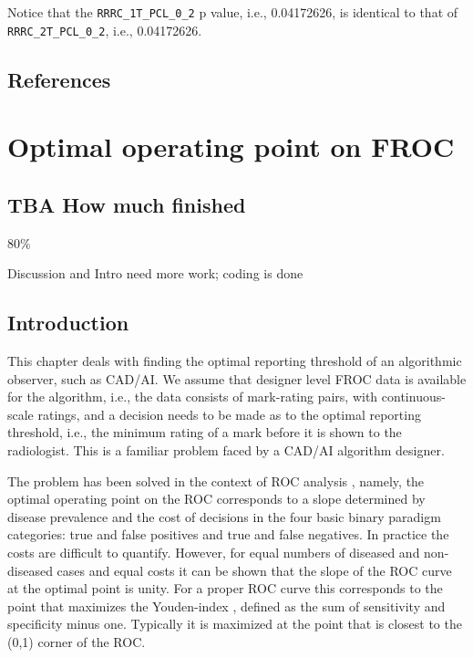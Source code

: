 \documentclass[
]{book}
\begin{document}
Notice that the \texttt{RRRC\_1T\_PCL\_0\_2} p value, i.e., 0.04172626, is identical to that of \texttt{RRRC\_2T\_PCL\_0\_2}, i.e., 0.04172626.

\hypertarget{standalone-cad-radiologists-references}{%
\section{References}\label{standalone-cad-radiologists-references}}

\hypertarget{optim-op-point}{%
\chapter{Optimal operating point on FROC}\label{optim-op-point}}

\hypertarget{optim-op-point-how-much-finished}{%
\section{TBA How much finished}\label{optim-op-point-how-much-finished}}

80\%

Discussion and Intro need more work; coding is done

\hypertarget{optim-op-point-intro}{%
\section{Introduction}\label{optim-op-point-intro}}

This chapter deals with finding the optimal reporting threshold of an algorithmic observer, such as CAD/AI. We assume that designer level FROC data is available for the algorithm, i.e., the data consists of mark-rating pairs, with continuous-scale ratings, and a decision needs to be made as to the optimal reporting threshold, i.e., the minimum rating of a mark before it is shown to the radiologist. This is a familiar problem faced by a CAD/AI algorithm designer.

The problem has been solved in the context of ROC analysis \citep{metz1978rocmethodology}, namely, the optimal operating point on the ROC corresponds to a slope determined by disease prevalence and the cost of decisions in the four basic binary paradigm categories: true and false positives and true and false negatives. In practice the costs are difficult to quantify. However, for equal numbers of diseased and non-diseased cases and equal costs it can be shown that the slope of the ROC curve at the optimal point is unity. For a proper ROC curve this corresponds to the point that maximizes the Youden-index \citep{youden1950index}, defined as the sum of sensitivity and specificity minus one. Typically it is maximized at the point that is closest to the (0,1) corner of the ROC.
\end{document}
